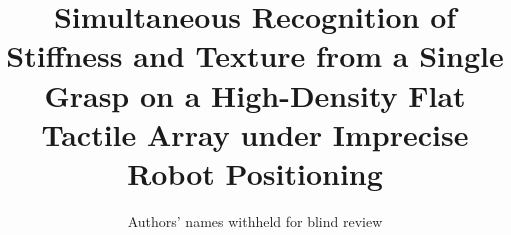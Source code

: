 \documentclass[journal]{IEEEtran}
\begin{document}


\title{Simultaneous Recognition of Stiffness and Texture from a Single Grasp on a High-Density Flat Tactile Array under Imprecise Robot Positioning}


\author{Authors' names withheld for blind review}%

%

%

%

%

%

%

%

\end{document}
